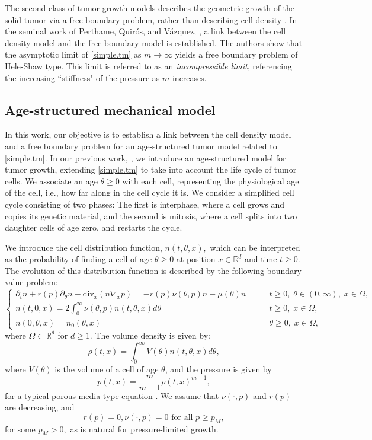 \documentclass{amsart}
\def\R{\mathbb R}
\begin{document}
The second class of tumor growth models describes the geometric growth of the solid tumor via a free boundary problem, rather than describing cell density \cite{Cui07042008,Friedman2008}. In the seminal work of Perthame, Quir\'os, and V\'azquez, \cite{PerthameQuiros2014}, a link between the cell density model and the free boundary model is established. The authors show that the asymptotic limit of \eqref{simple.tm} as $m \rightarrow \infty$ yields a free boundary problem of Hele-Shaw type. This limit is referred to as an \textit{incompressible limit}, referencing the increasing ``stiffness" of the pressure as $m$ increases.

\subsection{Age-structured mechanical model} In this work, our objective is to establish a link between the cell density model and a free boundary problem for an age-structured tumor model related to \eqref{simple.tm}. In our previous work, \cite{llmw}, we introduce an age-structured model for tumor growth, extending \eqref{simple.tm} to take into account the life cycle of tumor cells. We associate an age $\theta\geq 0$ with each cell, representing the physiological age of the cell, i.e., how far along in the cell cycle it is. We consider a simplified cell cycle consisting of two phases: The first is interphase, where a cell grows and copies its genetic material, and the second is mitosis, where a cell splits into two daughter cells of age zero, and restarts the cycle. 

We introduce the cell distribution function, $n(t,\theta,x),$ which can be interpreted as the probability of finding a cell of age $\theta \geq 0$ at position $x\in \R^d$ and time $t \geq 0$. The evolution of this distribution function is described by the following boundary value problem:
\begin{equation}\label{prol.e1}
    \begin{cases}
        \partial_t n+r(p)\partial_\theta n-
    \text{div}_x(n \nabla_x p)=-r(p)\nu(\theta,p)n -\mu(\theta)n\qquad &t \geq 0,\; \theta \in (0, \infty),\; x \in \Omega, \\
        n(t,0,x)=2  \int_0^{\infty}\nu(\theta,p)n(t,\theta,x) d\theta \qquad &t \geq 0,\; x \in \Omega, \\
        n(0,\theta,x)=n_{0}(\theta,x)\qquad & \theta \geq 0, \;x \in \Omega, 
    \end{cases}
\end{equation}
where $\Omega \subset \R^d$ for $d \geq 1$. The volume density is given by: $$\rho(t,x)=\int_{0}^{\infty}V(\theta)n(t,\theta,x) d\theta,$$ where $V(\theta)$ is the volume of a cell of age $\theta$, and the pressure is given by $$p(t,x)=\frac{m}{m-1}\rho(t,x)^{m-1},$$ for a typical porous-media-type equation \cite{pme}. We assume that $\nu(\cdot,p)$ and $r(p)$ are decreasing, and $$r(p)=0, \nu(\cdot,p)=0 \text{ for all } p \geq p_M,$$ for some $p_M>0,$  as is natural for pressure-limited growth. 
\end{document}
